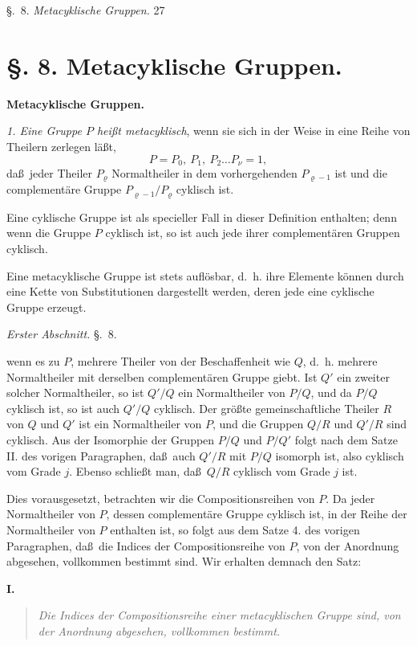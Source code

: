 \documentclass[12pt,a4paper]{book}
\begin{document}
\newpage
\noindent\S.~8. \hfill \textit{Metacyklische Gruppen.} \hfill 27

\vspace{0.3cm}

\section*{\S. 8. Metacyklische Gruppen.}

\begin{center}
\textbf{Metacyklische Gruppen.}
\end{center}

\textit{1. Eine Gruppe $P$ hei\ss t metacyklisch}, wenn sie sich in der Weise in eine Reihe von Theilern zerlegen l\"a\ss t,
\[P = P_0,\ P_1,\ P_2 \ldots P_\nu = 1,\]
da\ss\ jeder Theiler $P_\varrho$ Normaltheiler in dem vorhergehenden $P_{\varrho-1}$ ist und die complement\"are Gruppe $P_{\varrho-1}/P_\varrho$ cyklisch ist.

Eine cyklische Gruppe ist als specieller Fall in dieser Definition enthalten; denn wenn die Gruppe $P$ cyklisch ist, so ist auch jede ihrer complement\"aren Gruppen cyklisch.

Eine metacyklische Gruppe ist stets aufl\"osbar, d.~h. ihre Elemente k\"onnen durch eine Kette von Substitutionen dargestellt werden, deren jede eine cyklische Gruppe erzeugt.

\newpage
{} \hfill \textit{Erster Abschnitt.} \hfill \S.~8.

\vspace{0.3cm}

wenn es zu $P$, mehrere Theiler von der Beschaffenheit wie $Q$, d.~h. mehrere Normaltheiler mit derselben complement\"aren Gruppe giebt. Ist $Q'$ ein zweiter solcher Normaltheiler, so ist $Q'/Q$ ein Normaltheiler von $P/Q$, und da $P/Q$ cyklisch ist, so ist auch $Q'/Q$ cyklisch. Der gr\"o\ss te gemeinschaftliche Theiler $R$ von $Q$ und $Q'$ ist ein Normaltheiler von $P$, und die Gruppen $Q/R$ und $Q'/R$ sind cyklisch. Aus der Isomorphie der Gruppen $P/Q$ und $P/Q'$ folgt nach dem Satze II. des vorigen Paragraphen, da\ss\ auch $Q'/R$ mit $P/Q$ isomorph ist, also cyklisch vom Grade $j$. Ebenso schlie\ss t man, da\ss\ $Q/R$ cyklisch vom Grade $j$ ist.

Dies vorausgesetzt, betrachten wir die Compositionsreihen von $P$. Da jeder Normaltheiler von $P$, dessen complement\"are Gruppe cyklisch ist, in der Reihe der Normaltheiler von $P$ enthalten ist, so folgt aus dem Satze 4. des vorigen Paragraphen, da\ss\ die Indices der Compositionsreihe von $P$, von der Anordnung abgesehen, vollkommen bestimmt sind. Wir erhalten demnach den Satz:

\begin{center}
\textbf{I.}
\end{center}

\vspace{-0.2cm}
\begin{quote}
\textit{Die Indices der Compositionsreihe einer metacyklischen Gruppe sind, von der Anordnung abgesehen, vollkommen bestimmt.}
\end{quote}
\end{document}

